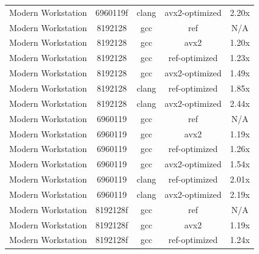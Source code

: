 \begin{table}[H]
\begin{tabularx}{\linewidth}{X c c c c}
          Modern Workstation &             6960119f &                clang &       avx2-optimized &                2.20x\\
          Modern Workstation &              8192128 &                  gcc &                  ref &                  N/A\\
          Modern Workstation &              8192128 &                  gcc &                 avx2 &                1.20x\\
          Modern Workstation &              8192128 &                  gcc &        ref-optimized &                1.23x\\
          Modern Workstation &              8192128 &                  gcc &       avx2-optimized &                1.49x\\
          Modern Workstation &              8192128 &                clang &        ref-optimized &                1.85x\\
          Modern Workstation &              8192128 &                clang &       avx2-optimized &                2.44x\\
          Modern Workstation &              6960119 &                  gcc &                  ref &                  N/A\\
          Modern Workstation &              6960119 &                  gcc &                 avx2 &                1.19x\\
          Modern Workstation &              6960119 &                  gcc &        ref-optimized &                1.26x\\
          Modern Workstation &              6960119 &                  gcc &       avx2-optimized &                1.54x\\
          Modern Workstation &              6960119 &                clang &        ref-optimized &                2.01x\\
          Modern Workstation &              6960119 &                clang &       avx2-optimized &                2.19x\\
          Modern Workstation &             8192128f &                  gcc &                  ref &                  N/A\\
          Modern Workstation &             8192128f &                  gcc &                 avx2 &                1.19x\\
          Modern Workstation &             8192128f &                  gcc &        ref-optimized &                1.24x\\

\end{tabularx}
\end{table}
